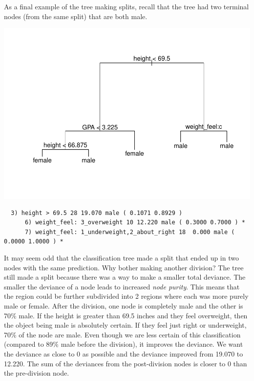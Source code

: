 \documentclass[12pt,twoside]{reedthesis}
\begin{document}
  As a final example of the tree making splits, recall that the tree had
  two terminal nodes (from the same split) that are both male.
  
  \begin{center}\includegraphics{A_Random_Forest_Model_for_Computer-Assisted_Activity-Recognition_files/figure-latex/unnamed-chunk-5-1} \end{center}
  
  \begin{verbatim}
  3) height > 69.5 28 19.070 male ( 0.1071 0.8929 )  
      6) weight_feel: 3_overweight 10 12.220 male ( 0.3000 0.7000 ) *
      7) weight_feel: 1_underweight,2_about_right 18  0.000 male ( 0.0000 1.0000 ) *
  \end{verbatim}
  
  It may seem odd that the classification tree made a split that ended up
  in two nodes with the same prediction. Why bother making another
  division? The tree still made a split because there was a way to make a
  smaller total deviance. The smaller the deviance of a node leads to
  increased \emph{node purity}. This means that the region could be
  further subdivided into 2 regions where each was more purely male or
  female. After the division, one node is completely male and the other is
  70\% male. If the height is greater than 69.5 inches and they feel
  overweight, then the object being male is absolutely certain. If they
  feel just right or underweight, 70\% of the node are male. Even though
  we are less certain of this classification (compared to 89\% male before
  the division), it improves the deviance. We want the deviance as close
  to 0 as possible and the deviance improved from 19.070 to 12.220. The
  sum of the deviances from the post-division nodes is closer to 0 than
  the pre-division node.
  
\end{document}
